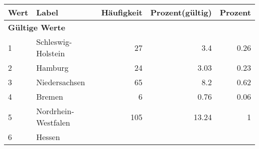      \begin{longtable}{lXrrr}
     \toprule
     \textbf{Wert} & \textbf{Label} & \textbf{Häufigkeit} & \textbf{Prozent(gültig)} & \textbf{Prozent} \\
     \endhead
     \midrule
     \multicolumn{5}{l}{\textbf{Gültige Werte}}\\

     1 &
     \multicolumn{1}{X}{ Schleswig-Holstein   } &


       \num{27} &
       \num[round-mode=places,round-precision=2]{3.4} &
         \num[round-mode=places,round-precision=2]{0.26} \\

     2 &
     \multicolumn{1}{X}{ Hamburg   } &


       \num{24} &
       \num[round-mode=places,round-precision=2]{3.03} &
         \num[round-mode=places,round-precision=2]{0.23} \\

     3 &
     \multicolumn{1}{X}{ Niedersachsen   } &


       \num{65} &
       \num[round-mode=places,round-precision=2]{8.2} &
         \num[round-mode=places,round-precision=2]{0.62} \\

     4 &
     \multicolumn{1}{X}{ Bremen   } &


       \num{6} &
       \num[round-mode=places,round-precision=2]{0.76} &
         \num[round-mode=places,round-precision=2]{0.06} \\

     5 &
     \multicolumn{1}{X}{ Nordrhein-Westfalen   } &


       \num{105} &
       \num[round-mode=places,round-precision=2]{13.24} &
         \num[round-mode=places,round-precision=2]{1} \\

     6 &
     \multicolumn{1}{X}{ Hessen   } &



\end{longtable}
